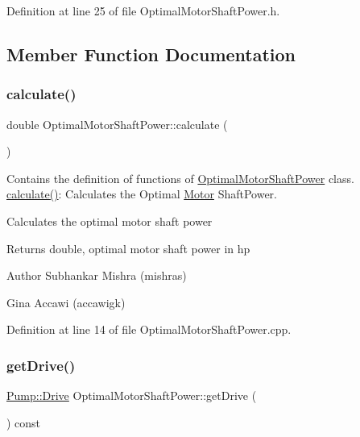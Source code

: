 Definition at line 25 of file Optimal\+Motor\+Shaft\+Power.\+h.



\subsection{Member Function Documentation}
\mbox{\label{class_optimal_motor_shaft_power_a34d47733928ae518fa6f3d08b7d8a12e}} 
\subsubsection{\texorpdfstring{calculate()}{calculate()}}
{\footnotesize\ttfamily double Optimal\+Motor\+Shaft\+Power\+::calculate (\begin{DoxyParamCaption}{ }\end{DoxyParamCaption})}



Contains the definition of functions of \hyperlink{class_optimal_motor_shaft_power}{Optimal\+Motor\+Shaft\+Power} class. \hyperlink{class_optimal_motor_shaft_power_a34d47733928ae518fa6f3d08b7d8a12e}{calculate()}\+: Calculates the Optimal \hyperlink{class_motor}{Motor} Shaft\+Power. 

Calculates the optimal motor shaft power

\begin{DoxyReturn}{Returns}
double, optimal motor shaft power in hp
\end{DoxyReturn}
\begin{DoxyAuthor}{Author}
Subhankar Mishra (mishras) 

Gina Accawi (accawigk) 
\end{DoxyAuthor}


Definition at line 14 of file Optimal\+Motor\+Shaft\+Power.\+cpp.

\mbox{\label{class_optimal_motor_shaft_power_a23e1045bb2e3ee62205276cbbebbc3ad}} 
\subsubsection{\texorpdfstring{get\+Drive()}{getDrive()}}
{\footnotesize\ttfamily \hyperlink{class_pump_a32bf0ade131a11bb3b3fb374f638e983}{Pump\+::\+Drive} Optimal\+Motor\+Shaft\+Power\+::get\+Drive (\begin{DoxyParamCaption}{ }\end{DoxyParamCaption}) const\hspace{0.3cm}{\ttfamily [inline]}}

